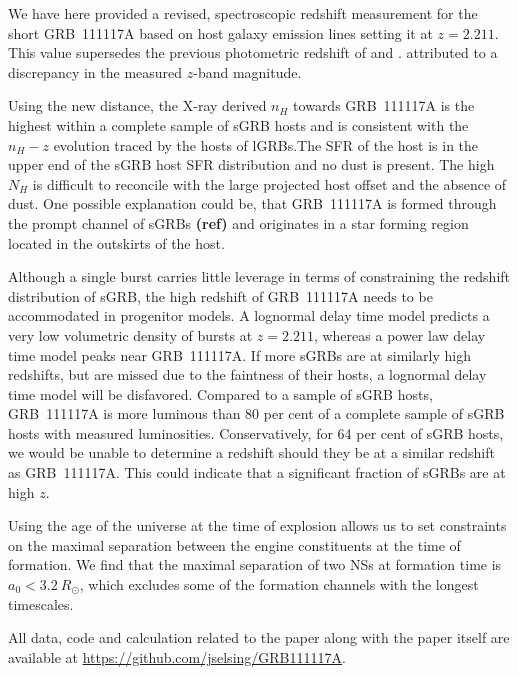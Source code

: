 \documentclass{aa}    %
\newcommand\todo[1]{\textbf{(#1)}}
\begin{document}
We have here provided a revised, spectroscopic redshift measurement for the
short GRB~111117A based on host galaxy emission lines setting it at $z = 2.211$.
This value supersedes the previous photometric redshift of \citet{Margutti2012}
and \citet{Sakamoto2013}. %
attributed to a discrepancy in the measured $z$-band magnitude.

Using the new distance, the X-ray derived $n_H$ towards GRB~111117A is the
highest within a complete sample of sGRB hosts and is consistent with the
$n_H-z$ evolution traced by the hosts of lGRBs.The SFR of the host is in the
upper end of the sGRB host SFR distribution and no dust is present. The high
$N_H$ is difficult to reconcile with the large projected host offset and the
absence of dust. One possible explanation could be, that GRB~111117A is formed
through the prompt channel of sGRBs \todo{ref} and originates in a star forming
region located in the outskirts of the host.

Although a single burst carries little leverage in terms of constraining the
redshift distribution of sGRB, the high redshift of GRB~111117A needs to be
accommodated in progenitor models. A lognormal delay time model predicts a very
low volumetric density of bursts at $z = 2.211$, whereas a power law delay time
model peaks near GRB~111117A. If more sGRBs are at similarly high redshifts, but
are missed due to the faintness of their hosts, a lognormal delay time model
will be disfavored. Compared to a sample of sGRB hosts, GRB~111117A is more
luminous than 80 per cent of a complete sample of sGRB hosts with measured
luminosities. Conservatively, for 64 per cent of sGRB hosts, we would be unable
to determine a redshift should they be at a similar redshift as GRB~111117A.
This could indicate that a significant fraction of sGRBs are at high $z$.

Using the age of the universe at the time of explosion allows us to set
constraints on the maximal separation between the engine constituents at the
time of formation. We find that the maximal separation of two NSs at
formation time is $a_0 < 3.2~R_\odot$, which excludes some of the formation
channels with the longest timescales.

All data, code and calculation related to the paper along with the
paper itself are available at \url{https://github.com/jselsing/GRB111117A}.
\end{document}
